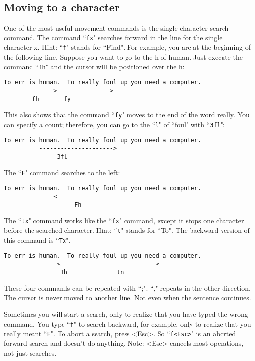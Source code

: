 \subsection{Moving to a character}
One of the most useful movement commands is the single-character search command.
The command ``\texttt{fx}" searches forward in the line for the single character x.
Hint: ``\texttt{f}" stands for ``Find".
For example, you are at the beginning of the following line.
Suppose you want to go to the h of human.
Just execute the command ``\texttt{fh}" and the cursor will be positioned over the h:

		\begin{Verbatim}[samepage=true]
    To err is human.  To really foul up you need a computer. 
    ---------->--------------->
        fh       fy
		\end{Verbatim}

This also shows that the command ``\texttt{fy}" moves to the end of the word really.
You can specify a count; therefore, you can go to the ``\texttt{l}" of ``foul" with ``\texttt{3fl}":

		\begin{Verbatim}[samepage=true]
    To err is human.  To really foul up you need a computer. 
          --------------------->
               3fl
		\end{Verbatim}

The ``\texttt{F}" command searches to the left:

		\begin{Verbatim}[samepage=true]
    To err is human.  To really foul up you need a computer. 
              <---------------------
                    Fh
		\end{Verbatim}

The ``\texttt{tx}" command works like the ``\texttt{fx}" command, except it stops one character before the searched character.
Hint: ``\texttt{t}" stands for ``To".
The backward version of this command is ``\texttt{Tx}".

		\begin{Verbatim}[samepage=true]
    To err is human.  To really foul up you need a computer. 
               <------------  ------------->
                Th              tn
		\end{Verbatim}

These four commands can be repeated with ``;".
``," repeats in the other direction.
The cursor is never moved to another line.
Not even when the sentence continues.

Sometimes you will start a search, only to realize that you have typed the wrong command.
You type ``\texttt{f}" to search backward, for example, only to realize that you really meant ``\texttt{F}".
To abort a search, press <Esc>.
So ``\texttt{f<Esc>}" is an aborted forward search and doesn't do anything.
Note: <Esc> cancels most operations, not just searches.


